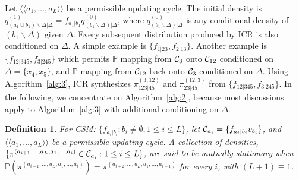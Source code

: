 \documentclass[12pt,a4paper]{article}
\newtheorem{definition}{Definition}
\begin{document}
Let $\langle \langle a_1,\ldots, a_L\rangle \rangle$ be a permissible updating cycle.
The initial density is $q^{(1)}_{(a_{1} \cup b_{1} )
\backslash \Delta | \Delta}= f_{a_{1} | b_{1}}
q^{(0)}_{(b_{1} \backslash \Delta) | \Delta}$, where
$q^{(0)}_{(b_{1} \backslash \Delta) | \Delta}$ is any
conditional density of $(b_{1} \backslash \Delta)$ given  $\Delta$.
Every subsequent  distribution produced by ICR is also conditioned on $\Delta$.
A simple example is $\{ f_{1|23}, f_{2|13}\}$.
Another example is $\{f_{12|345}, f_{3|245}\}$ which permits
${\mathbb P}$ mapping from ${\cal C}_3$ onto ${\cal C}_{12}$ conditioned on
$\Delta=\{x_4, x_5\}$, and ${\mathbb P}$ mapping from ${\cal C}_{12}$ back
onto ${\cal C}_{3}$ conditioned on $\Delta$. Using Algorithm~\ref{alg:3},
ICR synthesizes $\pi_{123|45}^{(3,12)}$ and $\pi_{23|45}^{(12,3)}$
from $\{f_{12|345}, f_{3|245}\}$.
In the following, we concentrate on Algorithm~\ref{alg:2},
because most discussions apply to Algorithm~\ref{alg:3} with
additional conditioning on $\Delta$.

\begin{definition}
For CSM: $\{f_{a_i|b_i}: b_i \ne \emptyset, 1 \le i \le L\}$, let
${\cal C}_{a_i}=\{ f_{a_i|b_i}v_{b_i}\}$, and
$\langle \langle a_1,\ldots, a_L\rangle \rangle$ be a permissible updating cycle.
A collection of densities,
$\{\pi^{(a_{i+1},\ldots,a_L,a_1,\ldots,a_i)} \in {\cal C}_{a_i}: 1 \le i \le L\}$, are said to
be mutually stationary when ${\mathbb P}(\pi^{(a_{i+1},\ldots,a_L,a_1,\ldots,a_i)})
= \pi^{(a_{i+2},\ldots,a_L,a_1,\ldots,a_{i+1})}$ for every $i$,
with $(L+1)\equiv 1$.
\end{definition}
\end{document}
